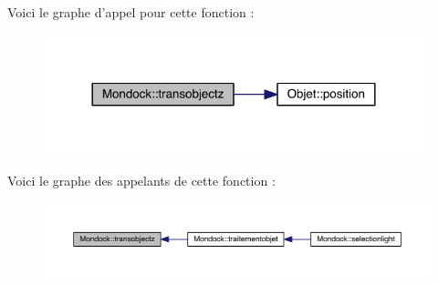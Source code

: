 Voici le graphe d'appel pour cette fonction \+:
\nopagebreak
\begin{figure}[H]
\begin{center}
\leavevmode
\includegraphics[width=312pt]{class_mondock_a4577b03f35f3e2eaa7d1826b1a9f0ebe_cgraph}
\end{center}
\end{figure}




Voici le graphe des appelants de cette fonction \+:
\nopagebreak
\begin{figure}[H]
\begin{center}
\leavevmode
\includegraphics[width=350pt]{class_mondock_a4577b03f35f3e2eaa7d1826b1a9f0ebe_icgraph}
\end{center}
\end{figure}




